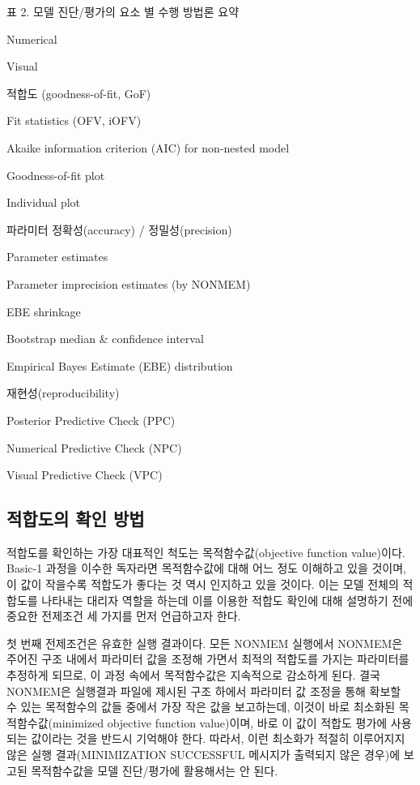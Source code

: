 \documentclass[
  10pt,
]{krantz}
\begin{document}
표 2. 모델 진단/평가의 요소 별 수행 방법론 요약

Numerical

Visual

적합도
(goodness-of-fit, GoF)

Fit statistics (OFV, iOFV)

Akaike information criterion (AIC) for
non-nested model

Goodness-of-fit plot

Individual plot

파라미터 정확성(accuracy) / 정밀성(precision)

Parameter estimates

Parameter imprecision estimates
(by NONMEM)

EBE shrinkage

Bootstrap median \& confidence interval

Empirical Bayes Estimate
(EBE) distribution

재현성(reproducibility)

Posterior Predictive Check (PPC)

Numerical Predictive Check (NPC)

Visual Predictive Check (VPC)

\hypertarget{uxc801uxd569uxb3c4uxc758-uxd655uxc778-uxbc29uxbc95}{%
\subsection{적합도의 확인 방법}\label{uxc801uxd569uxb3c4uxc758-uxd655uxc778-uxbc29uxbc95}}

적합도를 확인하는 가장 대표적인 척도는 목적함수값(objective function value)이다. Basic-1 과정을 이수한
독자라면 목적함수값에 대해 어느 정도 이해하고 있을 것이며, 이 값이 작을수록 적합도가 좋다는 것 역시 인지하고 있을 것이다.
이는 모델 전체의 적합도를 나타내는 대리자 역할을 하는데 이를 이용한 적합도 확인에 대해 설명하기 전에 중요한 전제조건 세
가지를 먼저 언급하고자 한다.

첫 번째 전제조건은 유효한 실행 결과이다. 모든 NONMEM 실행에서 NONMEM은 주어진 구조 내에서 파라미터 값을 조정해
가면서 최적의 적합도를 가지는 파라미터를 추정하게 되므로, 이 과정 속에서 목적함수값은 지속적으로 감소하게 된다. 결국
NONMEM은 실행결과 파일에 제시된 구조 하에서 파라미터 값 조정을 통해 확보할 수 있는 목적함수의 값들 중에서 가장 작은 값을
보고하는데, 이것이 바로 최소화된 목적함수값(minimized objective function value)이며, 바로 이 값이
적합도 평가에 사용되는 값이라는 것을 반드시 기억해야 한다. 따라서, 이런 최소화가 적절히 이루어지지 않은 실행
결과(MINIMIZATION SUCCESSFUL 메시지가 출력되지 않은 경우)에 보고된 목적함수값을 모델 진단/평가에
활용해서는 안 된다.
\end{document}

